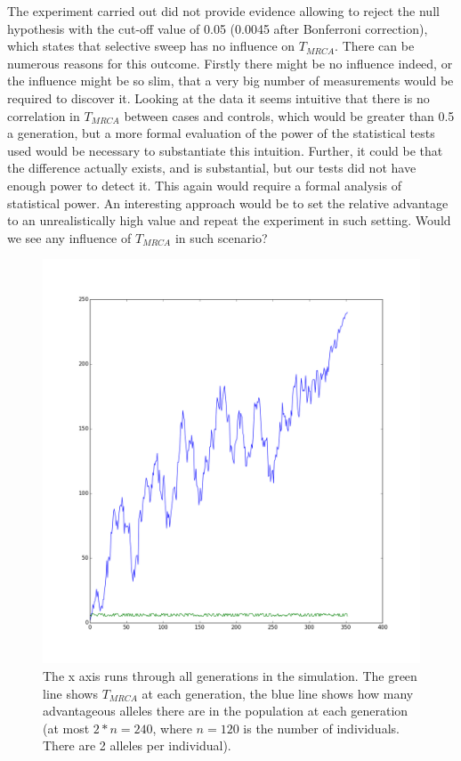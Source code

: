 \documentclass{l4proj}
\begin{document}
The experiment carried out did not provide evidence allowing to reject the null hypothesis with the cut-off value of 0.05 (0.0045 after Bonferroni correction), which states that selective sweep has no influence on $T_{MRCA}$. There can be numerous reasons for this outcome. Firstly there might be no influence indeed, or the influence might be so slim, that a very big number of measurements would be required to discover it. Looking at the data it seems intuitive that there is no correlation in $T_{MRCA}$ between cases and controls, which would be greater than 0.5 a generation, but a more formal evaluation of the power of the statistical tests used would be necessary to substantiate this intuition. Further, it could be that the difference actually exists, and is substantial, but our tests did not have enough power to detect it. This again would require a formal analysis of statistical power. An interesting approach would be to set the relative advantage to an unrealistically high value and repeat the experiment in such setting. Would we see any influence of $T_{MRCA}$ in such scenario?
\begin{figure}\label{slowEvolution}
\caption{The x axis runs through all generations in the simulation. The green line shows $T_{MRCA}$ at each generation, the blue line shows how many advantageous alleles there are in the population at each generation (at most $2*n=240$, where $n=120$ is the number of individuals. There are 2 alleles per individual).}
\centering
\includegraphics[scale=0.5]{slowEvolution}
\end{figure}
\end{document}
